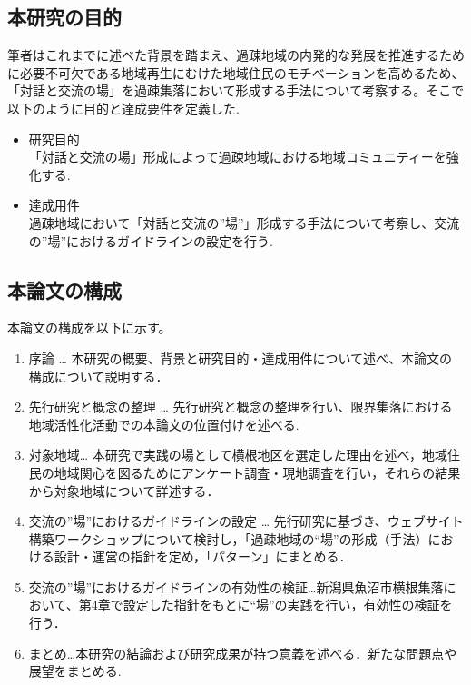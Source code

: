 \documentclass[a4paper]{jsarticle}
\begin{document}
\subsection{本研究の目的}
筆者はこれまでに述べた背景を踏まえ、過疎地域の内発的な発展を推進するために必要不可欠である地域再生にむけた地域住民のモチベーションを高めるため、「対話と交流の場」を過疎集落において形成する手法について考察する。そこで以下のように目的と達成要件を定義した.
\begin{itemize}
\item 研究目的　\\「対話と交流の場」形成によって過疎地域における地域コミュニティーを強化する.

\item 達成用件\\過疎地域において「対話と交流の”場”」形成する手法について考察し、交流の”場”におけるガイドラインの設定を行う.

\end{itemize}

\subsection{本論文の構成}
本論文の構成を以下に示す。
\begin{enumerate}
\item 序論 … 本研究の概要、背景と研究目的・達成用件について述べ、本論文の構成について説明する．
\item 先行研究と概念の整理 … 先行研究と概念の整理を行い、限界集落における地域活性化活動での本論文の位置付けを述べる.

\item 対象地域… 本研究で実践の場として横根地区を選定した理由を述べ，地域住民の地域関心を図るためにアンケート調査・現地調査を行い，それらの結果から対象地域について詳述する．
\item 交流の”場”におけるガイドラインの設定 … 先行研究に基づき、ウェブサイト構築ワークショップについて検討し，「過疎地域の“場”の形成（手法）における設計・運営の指針を定め，「パターン」にまとめる．

\item 交流の”場”におけるガイドラインの有効性の検証…新潟県魚沼市横根集落において、第4章で設定した指針をもとに“場”の実践を行い，有効性の検証を行う．
\item まとめ…本研究の結論および研究成果が持つ意義を述べる．新たな問題点や展望をまとめる.


\end{enumerate}
\end{document}
